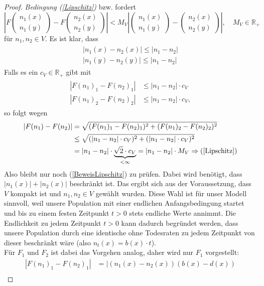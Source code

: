 \documentclass[11pt, a4paper, german]{article}
\theoremstyle{plain}
\newcommand{\tvec}[2]{\begin{pmatrix}#1\\#2\end{pmatrix}}
\begin{document}
\begin{proof}
		\textit{Bedingung (\ref{Lipschitz})} bzw. \cite[Kapitel 11 - \textbf{Thm 2.1} (2.7)]{ethier2009markov} fordert
		\[ \left| F\tvec{n_1(x)}{n_1(y)} - F\tvec{n_2(x)}{n_2(y)} \right| < M_V \left| \tvec{n_1(x)}{n_1(y)} - \tvec{n_2(x)}{n_2(y)} \right|, \quad M_V \in \mathbb{R}_{+} \]
		für $ n_1, n_2 \in V $. Es ist klar, dass
		\begin{align}
		\begin{split}
			|n_1(x) - n_2(x)| \le |n_1 - n_2|\\
			|n_1(y) - n_2(y)| \le |n_1 - n_2| \label{epsAbsch}
		\end{split}
		\end{align}
		Falls es ein $ c_V \in \mathbb{R}_{+} $ gibt mit
		\begin{align}
		\begin{split}
			|F(n_1)_1 - F(n_2)_1| &\le |n_1 - n_2| \cdot c_V\\
			|F(n_1)_2 - F(n_2)_2| &\le |n_1 - n_2| \cdot c_V, \label{BeweisLipschitz}
		\end{split}
		\end{align}
		so folgt wegen 
		\begin{align}
		\begin{split}
			|F(n_1) - F(n_2)| &= \sqrt{(F(n_1)_1 - F(n_2)_1)^2 + (F(n_1)_2 - F(n_2)_2)^2}\\
			&\le \sqrt{(|n_1 - n_2| \cdot c_V)^2 + (|n_1 - n_2| \cdot c_V)^2}\\
			&= |n_1 - n_2| \cdot \underbrace{\sqrt{2} \cdot c_V}_{< \infty} = |n_1 - n_2| \cdot M_V \Rightarrow (\ref{Lipschitz})
			\label{epsBehauptung}
		\end{split}
		\end{align}
		Also bleibt nur noch (\ref{BeweisLipschitz}) zu prüfen. Dabei wird benötigt, dass $ |n_1(x)| + |n_2(x)| $ beschränkt ist. Das ergibt sich aus der Voraussetzung, dass $ V $ kompakt ist und $ n_1, n_2 \in V $ gewählt wurden. Diese Wahl ist für unser Modell sinnvoll, weil unsere Population mit einer endlichen Anfangsbedingung startet und bis zu einem festen Zeitpunkt $ t > 0 $ stets endliche Werte annimmt. Die Endlichkeit zu jedem Zeitpunkt $ t > 0 $ kann dadurch begründet werden, dass unsere Population durch eine identische ohne Todesraten zu jedem Zeitpunkt von dieser beschränkt wäre (also $ n_t(x) = b(x) \cdot t $).\\
		Für $ F_1 $ und $ F_2 $ ist dabei das Vorgehen analog, daher wird nur $ F_1 $ vorgestellt:
		\begin{align*}
			|F(n_1)_1 - F(n_2)_1| & = |(n_1(x) - n_2(x))(b(x) - d(x)) \\

\end{align*}
\end{proof}
\end{document}
